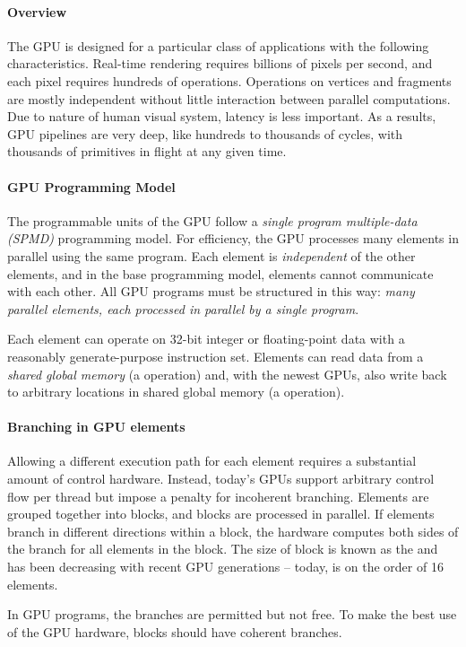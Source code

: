 \documentclass{memo}
\begin{document}
\small
{}


\paragraph{Overview}
The GPU is designed for a particular class of applications with the following
characteristics.
\bit
\w {} Real-time rendering requires
billions of pixels per second, and each pixel requires hundreds of
operations.  
\w {} Operations on vertices and fragments are
mostly independent without little interaction between parallel computations.
\w {} Due to nature of human
visual system, latency is less important. As a results, GPU pipelines are very
deep, like hundreds to thousands of cycles, with thousands of primitives in
flight at any given time. 
\eit

\paragraph{GPU Programming Model}
The programmable units of the GPU follow a {\em single program multiple-data
  (SPMD)} programming model. For efficiency, the GPU processes many elements
in parallel using the same program. Each element is {\em independent\/} of the
other elements, and in the base programming model, elements cannot communicate
with each other. All GPU programs must be structured in this way: {\em many
  parallel elements, each processed in parallel by a single program\/}. 

Each element can operate on 32-bit integer or floating-point data with a
reasonably generate-purpose instruction set. Elements can read data from a
{\em shared global memory\/} (a  operation) and, with the newest
GPUs, also write back to arbitrary locations in shared global memory
(a  operation).

\paragraph{Branching in GPU elements}
Allowing a different execution path for each element requires a substantial
amount of control hardware. Instead, today's GPUs support arbitrary control
flow per thread but impose a penalty for incoherent branching.  Elements are
grouped together into blocks, and blocks are processed in parallel. If
elements branch in different directions within a block, the hardware computes
both sides of the branch for all elements in the block. The size of block is
known as the  and has been decreasing with recent GPU
generations -- today, is on the order of 16 elements. 

In GPU programs, the branches are permitted but not free. To make the best use
of the GPU hardware, blocks should have coherent branches. 
\end{document}
